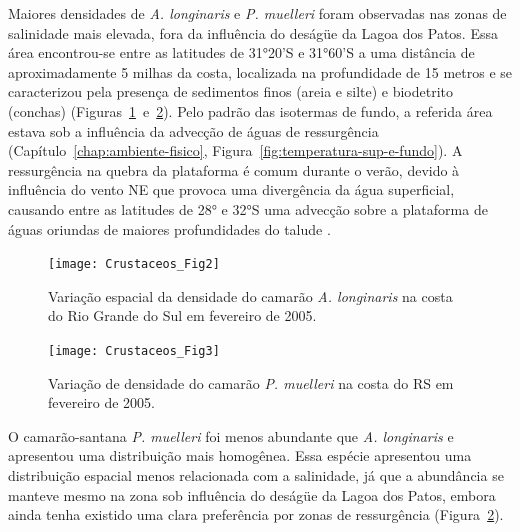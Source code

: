 \documentclass[a4paper,11pt,twoside,showtrims,onecolumn,openright,final]{memoir}
\begin{document}
Maiores densidades de \emph{A. longinaris} e \emph{P. muelleri} foram observadas nas zonas 
de salinidade mais elevada, fora da influência do deságüe da Lagoa dos Patos. 
Essa área encontrou-se entre as latitudes de 31°20'S e 31°60'S a uma distância de 
aproximadamente 5 milhas da costa, localizada na profundidade de 15 metros e 
se caracterizou pela presença de sedimentos finos (areia e silte) 
e biodetrito (conchas) (Figuras~\ref{fig:crustaceos2}~e~\ref{fig:crustaceos3}). 
Pelo padrão  das isotermas de fundo, a referida área estava sob a influência da 
advecção de águas de ressurgência (Capítulo~\ref{chap:ambiente-fisico}, Figura~\ref{fig:temperatura-sup-e-fundo}).  %
A ressurgência na quebra da plataforma é comum durante o verão, devido à influência 
do vento NE que provoca uma divergência da água superficial, causando entre as 
latitudes de 28° e 32°S uma advecção sobre a plataforma de águas oriundas de maiores 
profundidades do talude \citep{hubold1980}.

%
%

\begin{figure}
\begin{center}
\texttt{[image: Crustaceos\_Fig2]}
\end{center}
\caption[Variação espacial da densidade do camarão \emph{A. longinaris} na costa do Rio Grande do Sul.]
	{Variação espacial da densidade do camarão \emph{A. longinaris} na costa do Rio Grande do Sul em fevereiro de 2005.}
\label{fig:crustaceos2}
\end{figure}



%
%

\begin{figure}
\begin{center}
\texttt{[image: Crustaceos\_Fig3]}
\end{center}
\caption[Variação de densidade do camarão \emph{P. muelleri} na costa do RS.]
	{Variação de densidade do camarão \emph{P. muelleri} na costa do RS em fevereiro de 2005.}
\label{fig:crustaceos3}
\end{figure}


O camarão-santana \emph{P. muelleri} foi menos abundante que \emph{A. longinaris} e apresentou 
uma distribuição mais homogênea.  Essa espécie apresentou uma distribuição espacial menos 
relacionada com a salinidade, já que a abundância se manteve mesmo na zona sob influência do 
deságüe da Lagoa dos Patos, embora ainda tenha existido uma clara preferência 
por zonas de ressurgência (Figura~\ref{fig:crustaceos3}).
\end{document}
